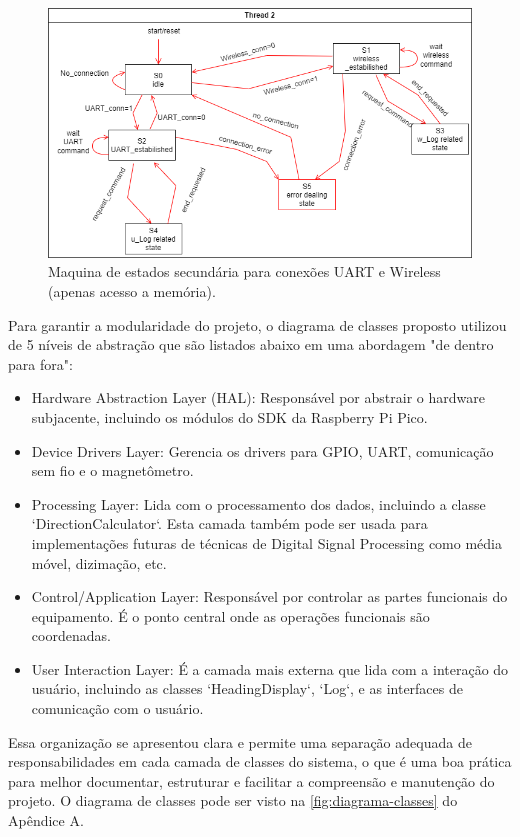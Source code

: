 \documentclass[10pt,twocolumn,letterpaper]{article}
\begin{document}
\begin{figure}[h]
  \centering
  \includegraphics[width=\linewidth]{figures/maquina_estados2.2.png}
  \caption{Maquina de estados secundária para conexões UART e Wireless (apenas acesso a memória).}
  \label{fig:maquina_estados2}
\end{figure}


Para garantir a modularidade do projeto, o diagrama de classes proposto utilizou de 5 níveis de abstração que são listados 
abaixo em uma abordagem "de dentro para fora":
\begin{itemize}
  \item Hardware Abstraction Layer (HAL): Responsável por abstrair o hardware subjacente, incluindo os módulos do SDK da Raspberry Pi Pico.
  \item Device Drivers Layer: Gerencia os drivers para GPIO, UART, comunicação sem fio e o magnetômetro.
  \item Processing Layer: Lida com o processamento dos dados, incluindo a classe `DirectionCalculator`. Esta camada também pode ser usada 
  para implementações futuras de técnicas de Digital Signal Processing como média móvel, dizimação, etc.
  \item Control/Application Layer: Responsável por controlar as partes funcionais do equipamento. É o ponto central onde as operações 
  funcionais são coordenadas. 
  \item User Interaction Layer: É a camada mais externa que lida com a interação do usuário, incluindo as classes `HeadingDisplay`, `Log`, 
  e as interfaces de comunicação com o usuário.
\end{itemize}
Essa organização se apresentou clara e permite uma separação adequada de responsabilidades em cada camada de classes do sistema, 
o que é uma boa prática para melhor documentar, estruturar e facilitar a compreensão e manutenção do projeto. O diagrama de classes 
pode ser visto na \autoref{fig:diagrama-classes} do Apêndice A.
\end{document}
